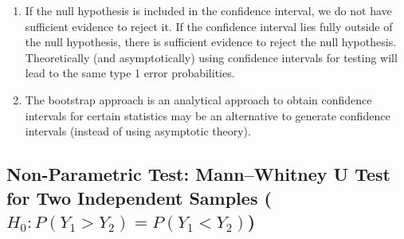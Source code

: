 \begin{enumerate}
    \item If the null hypothesis is included in the confidence interval, we do not have sufficient evidence to reject it.
    If the confidence interval lies fully outside of the null hypothesis, there is sufficient evidence to reject the null hypothesis. 
    Theoretically (and asymptotically) using confidence intervals for testing will lead to the same type 1 error probabilities.
    \hfill \cite{statistics/book/Statistics-for-Data-Scientists/Maurits-Kaptein}

    \item The bootstrap approach is an analytical approach to obtain confidence intervals for certain statistics may be an alternative to generate confidence intervals (instead of using asymptotic theory).
    \hfill \cite{statistics/book/Statistics-for-Data-Scientists/Maurits-Kaptein}
\end{enumerate}



\subsection{Non-Parametric Test: Mann–Whitney U Test for Two Independent Samples ($H_0 : P(Y_1 > Y_2) = P(Y_1 < Y_2)$)}

